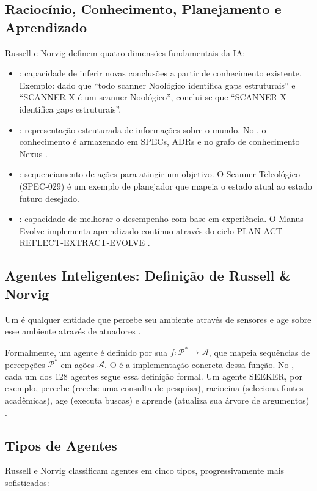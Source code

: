 \subsection{Raciocínio, Conhecimento, Planejamento e Aprendizado}
Russell e Norvig \cite{russell2020inteligencia} definem quatro dimensões
fundamentais da IA:
\begin{itemize}
\item {}: capacidade de inferir novas conclusões a partir
de conhecimento existente. Exemplo: dado que ``todo scanner Noológico
identifica gaps estruturais'' e ``SCANNER-X é um scanner Noológico'',
conclui-se que ``SCANNER-X identifica gaps estruturais''.
\item {}: representação estruturada de informações
sobre o mundo. No \opencodeeco{}, o conhecimento é armazenado em SPECs,
ADRs e no grafo de conhecimento Nexus \cite{opencode2026scanner}.
\item {}: sequenciamento de ações para atingir um
objetivo. O Scanner Teleológico (SPEC-029) é um exemplo de planejador que
mapeia o estado atual ao estado futuro desejado.
\item {}: capacidade de melhorar o desempenho com base
em experiência. O Manus Evolve implementa aprendizado contínuo através do
ciclo PLAN-ACT-REFLECT-EXTRACT-EVOLVE \cite{opencode2026manus}.
\end{itemize}
\subsection{Agentes Inteligentes: Definição de Russell \& Norvig}
\begin{definicao}
Um  é qualquer entidade que percebe seu
ambiente através de sensores e age sobre esse ambiente através de
atuadores \cite{russell2020inteligencia}.
\end{definicao}
Formalmente, um agente é definido por sua 
$f: \mathcal{P}^* \to \mathcal{A}$, que mapeia sequências de percepções
$\mathcal{P}^*$ em ações $\mathcal{A}$. O  é a
implementação concreta dessa função.
No \opencodeeco{}, cada um dos 128 agentes segue essa definição formal. Um
agente SEEKER, por exemplo, percebe (recebe uma consulta de pesquisa), raciocina
(seleciona fontes acadêmicas), age (executa buscas) e aprende (atualiza sua
árvore de argumentos) \cite{opencode2026seeker}.
\subsection{Tipos de Agentes}
Russell e Norvig \cite{russell2020inteligencia} classificam agentes em cinco
tipos, progressivamente mais sofisticados:
